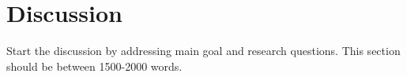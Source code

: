 

\section*{Discussion}
Start the discussion by addressing main goal and research questions. This section should be between 1500-2000 words.
\lipsum[1-4]\cite{dicarlo2012does,cichy2014resolving}
\lipsum[3-9]\cite{hung2005fast,kourtzi2011neural,dicarlo2012does}